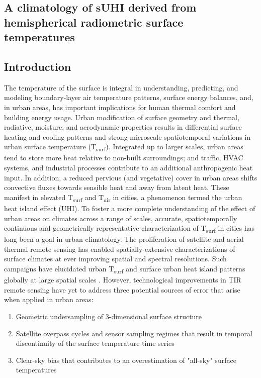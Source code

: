 \begin{bibunit}

\rhead{\thepage}

\chapter{A climatology of sUHI derived from hemispherical radiometric surface temperatures}
\label{paper2}

\section{Introduction}

The temperature of the surface is integral in understanding, predicting, and modeling boundary-layer air temperature patterns, surface energy balances, and, in urban areas, has important implications for human thermal comfort and building energy usage. Urban modification of surface geometry and thermal, radiative, moisture, and aerodynamic properties results in differential surface heating and cooling patterns and strong microscale spatiotemporal variations in urban surface temperature (T\textsubscript{surf}). Integrated up to larger scales, urban areas tend to store more heat relative to non-built surroundings; and traffic, HVAC systems, and industrial processes contribute to an additional anthropogenic heat input. In addition, a reduced pervious (and vegetative) cover in urban areas shifts convective fluxes towards sensible heat and away from latent heat. These manifest in elevated T\textsubscript{surf} and T\textsubscript{air} in cities, a phenomenon termed the urban heat island effect (UHI). To foster a more complete understanding of the effect of urban areas on climates across a range of scales, accurate, spatiotemporally continuous and geometrically representative characterization of T\textsubscript{surf} in cities has long been a goal in urban climatology. The proliferation of satellite and aerial thermal remote sensing has enabled spatially-extensive characterizations of surface climates at ever improving spatial and spectral resolutions. Such campaigns have elucidated urban T\textsubscript{surf} and surface urban heat island patterns globally at large spatial scales \citep{Peng2012,Zhao2014}. However, technological improvements in TIR remote sensing have yet to address three potential sources of error that arise when applied in urban areas: 

\begin{enumerate}
	\item Geometric undersampling of 3-dimensional surface structure
	\item Satellite overpass cycles and sensor sampling regimes that result in temporal discontinuity of the surface temperature time series
	\item Clear-sky bias that contributes to an overestimation of "all-sky" surface temperatures
\end{enumerate}


\end{bibunit}
